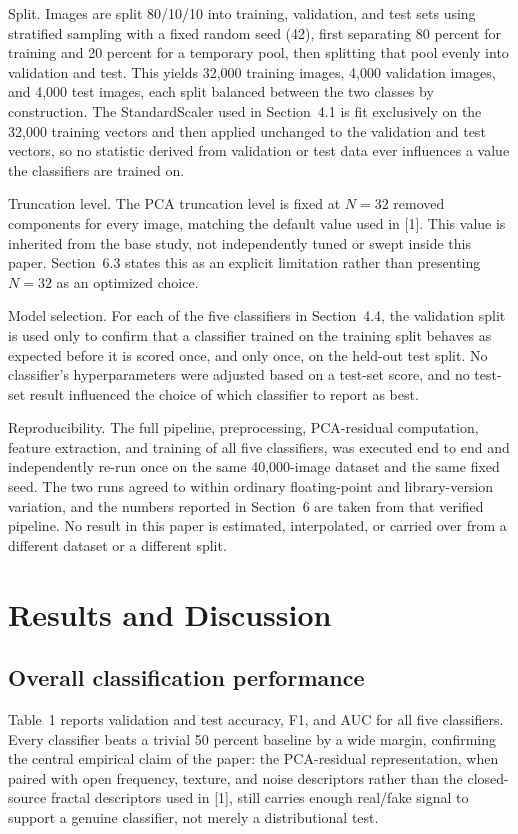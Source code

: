 \documentclass[11pt]{article}
\begin{document}
Split. Images are split 80/10/10 into training, validation, and test sets using stratified sampling with a fixed random seed (42), first separating 80 percent for training and 20 percent for a temporary pool, then splitting that pool evenly into validation and test. This yields 32,000 training images, 4,000 validation images, and 4,000 test images, each split balanced between the two classes by construction. The StandardScaler used in Section~4.1 is fit exclusively on the 32,000 training vectors and then applied unchanged to the validation and test vectors, so no statistic derived from validation or test data ever influences a value the classifiers are trained on.

Truncation level. The PCA truncation level is fixed at $N=32$ removed components for every image, matching the default value used in [1]. This value is inherited from the base study, not independently tuned or swept inside this paper. Section~6.3 states this as an explicit limitation rather than presenting $N=32$ as an optimized choice.

Model selection. For each of the five classifiers in Section~4.4, the validation split is used only to confirm that a classifier trained on the training split behaves as expected before it is scored once, and only once, on the held-out test split. No classifier's hyperparameters were adjusted based on a test-set score, and no test-set result influenced the choice of which classifier to report as best.

Reproducibility. The full pipeline, preprocessing, PCA-residual computation, feature extraction, and training of all five classifiers, was executed end to end and independently re-run once on the same 40,000-image dataset and the same fixed seed. The two runs agreed to within ordinary floating-point and library-version variation, and the numbers reported in Section~6 are taken from that verified pipeline. No result in this paper is estimated, interpolated, or carried over from a different dataset or a different split.

\section{Results and Discussion}

\subsection{Overall classification performance}

Table~1 reports validation and test accuracy, F1, and AUC for all five classifiers. Every classifier beats a trivial 50 percent baseline by a wide margin, confirming the central empirical claim of the paper: the PCA-residual representation, when paired with open frequency, texture, and noise descriptors rather than the closed-source fractal descriptors used in [1], still carries enough real/fake signal to support a genuine classifier, not merely a distributional test.
\end{document}
